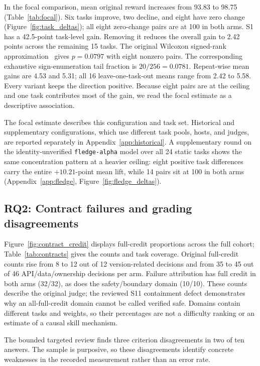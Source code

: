 \documentclass[11pt]{article}
\begin{document}
In the focal comparison, mean original reward increases from 93.83 to 98.75 (Table~\ref{tab:focal}). Six tasks improve, two decline, and eight have zero change (Figure~\ref{fig:task_deltas}); all eight zero-change pairs are at 100 in both arms. S1 has a 42.5-point task-level gain. Removing it reduces the overall gain to 2.42 points across the remaining 15 tasks. The original Wilcoxon signed-rank approximation~\citep{wilcoxon1945individual} gives $p=0.0797$ with eight nonzero pairs. The corresponding exhaustive sign-enumeration tail fraction is $20/256=0.0781$. Repeat-wise mean gains are 4.53 and 5.31; all 16 leave-one-task-out means range from 2.42 to 5.58. Every variant keeps the direction positive. Because eight pairs are at the ceiling and one task contributes most of the gain, we read the focal estimate as a descriptive association.

The focal estimate describes this configuration and task set. Historical and supplementary configurations, which use different task pools, hosts, and judges, are reported separately in Appendix~\ref{app:historical}. A supplementary round on the identity-unverified \texttt{fledge-alpha} model over all 24 static tasks shows the same concentration pattern at a heavier ceiling: eight positive task differences carry the entire $+10.21$-point mean lift, while 14 pairs sit at 100 in both arms (Appendix~\ref{app:fledge}, Figure~\ref{fig:fledge_deltas}).

\subsection{RQ2: Contract failures and grading disagreements}\label{sec:rq2}


Figure~\ref{fig:contract_credit} displays full-credit proportions across the full cohort; Table~\ref{tab:contracts} gives the counts and task coverage. Original full-credit counts rise from 8 to 12 out of 12 version-related decisions and from 35 to 45 out of 46 API/data/ownership decisions per arm. Failure attribution has full credit in both arms (32/32), as does the safety/boundary domain (10/10). These counts describe the original judge; the reviewed S11 containment defect demonstrates why an all-full-credit domain cannot be called verified safe. Domains contain different tasks and weights, so their percentages are not a difficulty ranking or an estimate of a causal skill mechanism.

The bounded targeted review finds three criterion disagreements in two of ten answers. The sample is purposive, so these disagreements identify concrete weaknesses in the recorded measurement rather than an error rate.
\end{document}
